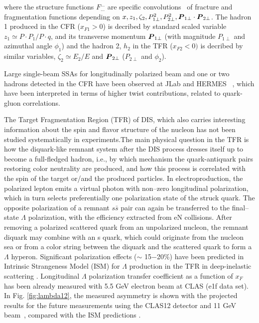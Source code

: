\documentclass[11pt,a4paper]{article}
\def\Vec#1{\mathpalette{\VVec}{#1}}
\def\VVec#1#2{\mbox{\boldmath$#1#2$\unboldmath}}
\begin{document}
where the structure functions $F_{...}^{...}$ are specific convolutions~\cite{Anselmino:2011bb} of fracture and fragmentation functions depending on $x, z_1, \zeta_2, P_{1\perp}^2,  P_{2\perp}^2, {\Vec P}_{1\perp} \cdot
{\Vec P}_{2\perp}$.
The hadron 1 produced in the CFR ($x_{F1}>0$) is decribed by  standard scaled variable $z_1 \simeq P{\cdot}P_1/P{\cdot}q$,  and its transverse momentum ${\Vec P}_{1\perp}$ (with magnitude $P_{1\perp}$ and azimuthal angle
$\phi_1$) and the hadron 2, $h_2$  in the TFR ($x_{F2}<0)$ is decribed by similar variables,  $\zeta_2 \simeq E_2/E$
and ${\Vec P}_{2\perp}$ ($P_{2\perp}$ and $\phi_2$).


Large single-beam SSAs  for longitudinally polarized beam and one or two hadrons detected in the CFR have been observed at JLab \cite{Avakian:2003pk,E12-06-112B} and
HERMES~ \cite{Airapetian:2006rx}, which have been interpreted in terms of higher twist contributions, related to quark-gluon correlations.

The Target Fragmentation Region
(TFR) of DIS, which also carries interesting information about the spin and flavor structure
of the nucleon has not been studied systematically in experiments.The main physical question in the TFR is how the diquark-like remnant system after
the DIS process dresses itself up to become a full-fledged hadron, i.e., by which mechanism
the quark-antiquark pairs restoring color neutrality are produced, and how this process is
correlated with the spin of the target or/and the produced particles. In electroproduction, the
polarized lepton emits a virtual photon with non–zero longitudinal polarization, which in turn
selects preferentially one polarization state of the struck quark. The opposite polarization
of a remnant $s\bar{s}$ pair can again be transferred to the final–state  $\Lambda$  polarization, with the
efficiency extracted from eN collisions. After removing a polarized scattered quark from
an unpolarized nucleon, the remnant diquark may combine with an s quark, which could
originate from the nucleon sea or from a color string between the diquark and the scattered
quark to form a  $\Lambda$  hyperon. Significant polarization effects ($\sim$ 15−20\%) have been predicted in Intrinsic Strangeness Model (ISM) for  $\Lambda$  production in the TFR in deep-inelastic scattering  \cite{Ellis:1995fc}.
Longitudinal $\Lambda$ polarization transfer coefficient as a function of $x_F$ has been already 
measured with 5.5 GeV electron beam at CLAS (e1f data set). In Fig. \ref{fig:lambda12}, 
the measured asymmetry is  shown with the projected results for the future measurements using the CLAS12 detector and 11 GeV beam~\cite{E12-06-112A},  compared with the  ISM predictions  \cite{Ellis:1995fc}.
\end{document}

